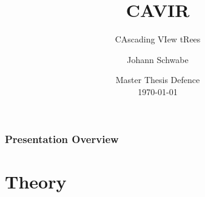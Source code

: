 \documentclass[
	11pt, %
]{beamer}
\title[CAVIR]{CAVIR} %
\subtitle{CAscading VIew tRees} %
\author[Johann Schwabe]{Johann Schwabe} %
\institute[UZH]{University of Zurich\\ \smallskip \textit{johann.schwabe@uzh.ch}} %
\date[\today]{Master Thesis Defence \\ \today} %
\begin{document}

\begin{frame}
	\titlepage %
\end{frame}



\begin{frame}
	\frametitle{Presentation Overview} %
	
	\tableofcontents %
\end{frame}


\section{Theory} %
\end{document}
